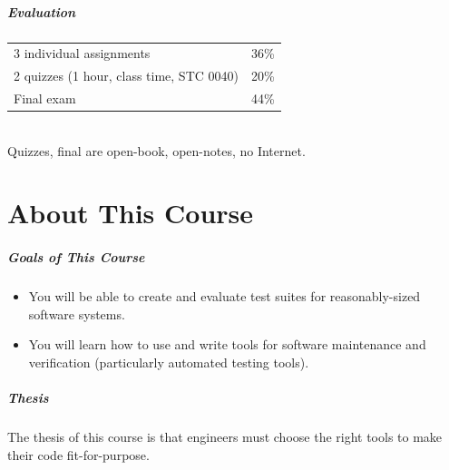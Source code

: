 \documentclass{beamer}
\newenvironment{changemargin}[1]{%
  \begin{list}{}{%
    \setlength{\topsep}{0pt}%
    \setlength{\leftmargin}{#1}%
    \setlength{\rightmargin}{1em}
    \setlength{\listparindent}{\parindent}%
    \setlength{\itemindent}{\parindent}%
    \setlength{\parsep}{\parskip}%
  }%
  \item[]}{\end{list}}
\begin{document}
\begin{frame}
  \frametitle{Evaluation}
  \Large
\begin{changemargin}{1em}
\begin{tabular}{lr}
3 individual assignments & 36\% \\
2 quizzes (1 hour, class time, STC 0040) & 20\% \\
Final exam & 44\% \\
\end{tabular}~\\[1em]

Quizzes, final are open-book, open-notes, no Internet.\\[1em]

\end{changemargin}

\end{frame}

\usebackgroundtemplate{}


\part{About This Course}
\begin{frame}
  \partpage
\end{frame}

\begin{frame}

  \frametitle{Goals of This Course}

    \begin{changemargin}{2em}

  \begin{itemize}

  \item You will be able to create and evaluate test suites for reasonably-sized
software systems.\\[1em]

  \item You will learn how to use and write tools for software maintenance and
verification (particularly automated testing tools).\\[1em]

  \end{itemize}
    \end{changemargin}

\end{frame}

\begin{frame}
  \frametitle{Thesis}

  \Large
  \begin{changemargin}{2em}
    The thesis of this course is that engineers must choose the right tools to make their code fit-for-purpose.
  \end{changemargin}
\end{frame}
\end{document}
